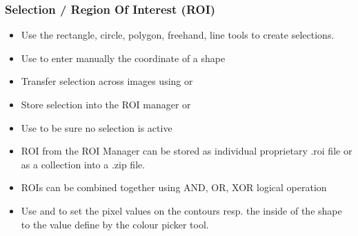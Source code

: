 \documentclass[ignorenonframetext,aspectratio=169,10pt,xcolor=table]{beamer}
\begin{document}
\begin{frame} \frametitle{Selection / Region Of Interest (ROI)}
  \begin{itemize} \setlength\itemsep{1em}
  \item Use the rectangle, circle, polygon, freehand, line tools to
    create selections.
  \item Use  to enter manually the
    coordinate of a shape
  \item Transfer selection across images using
     or 
  \item Store selection into the ROI manager  or 
  \item Use   to
    be sure no selection is active
  \item ROI from the ROI Manager can be stored as individual
    proprietary .roi file or as a collection into a .zip file.
  \item ROIs can be combined together using AND, OR, XOR logical
    operation
  \item Use  and  to set the pixel
    values on the contours resp. the inside of the shape to the value
    define by the colour picker tool.
  \end{itemize}
\end{frame}
\end{document}
